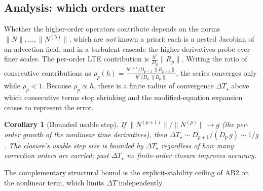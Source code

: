 \documentclass[11pt]{article}
\theoremstyle{plain}
\newtheorem{corollary}{Corollary}
\theoremstyle{definition}
\newcommand{\Ndot}{\dot{N}}
\newcommand{\DT}{\Delta T}
\begin{document}
\subsection{Analysis: which orders matter}
\label{sec:analysis}
Whether the higher-order operators contribute depends on the norms
$\|\Ndot\|,\dots,\|N^{(5)}\|$, which are \emph{not} known a priori: each is a
nested Jacobian of an advection field, and in a turbulent cascade the higher
derivatives probe ever finer scales. The per-order LTE contribution is
$\frac{h^p}{D_p}\|R_p\|$. Writing the ratio of consecutive contributions as
$\rho_p(h)=\frac{h^{p+1}/D_{p+1}\,\|R_{p+1}\|}{h^{p}/D_{p}\,\|R_{p}\|}$, the
series converges only while $\rho_p<1$. Because $\rho_p\propto h$, there is a
finite radius of convergence $\DT_\star$ above which consecutive terms stop
shrinking and the modified-equation expansion ceases to represent the error.

\begin{corollary}[Bounded usable step]
\label{cor:radius}
If $\|N^{(p+1)}\|/\|N^{(p)}\|\to g$ (the per-order growth of the nonlinear time
derivatives), then $\DT_\star\sim D_{p+1}/(D_p\,g)\sim 1/g$. The closure's
usable step size is bounded by $\DT_\star$ \emph{regardless of how many
correction orders are carried}; past $\DT_\star$ no finite-order closure
improves accuracy.
\end{corollary}
\noindent The complementary structural bound is the explicit-stability ceiling
of AB2 on the nonlinear term, which limits $\DT$ independently.
\end{document}
